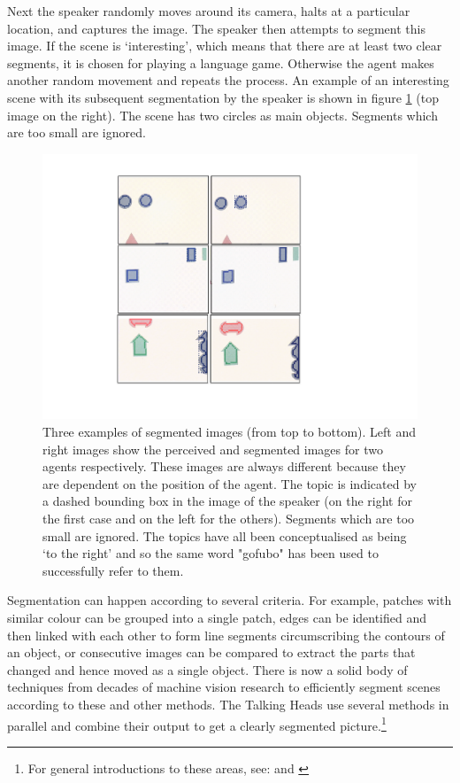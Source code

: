 Next the speaker randomly moves around its camera, halts 
at a particular location, and captures
the image. The speaker then attempts to segment 
this image. If the scene is `interesting', which means that
there are at least two clear segments, it is chosen 
for playing a language game. Otherwise the agent makes another 
random movement and repeats the process. An example of 
an interesting scene with its subsequent segmentation
by the speaker is shown in figure \ref{f:plate10} (top image on the right). The scene
has two circles as main objects. Segments which are too 
small are ignored. 

\begin{figure}[htbp]
  \centerline{\includegraphics[width=.60\textwidth]{chap2/figs/hpos}}
\caption{\small Three examples of segmented images (from top to bottom). Left and right images 
show the perceived and segmented images for two agents respectively. These images are always
different because they are dependent on the position of the agent. 
The topic is indicated by a dashed bounding box in the 
image of the speaker (on the right for the first case and on the left for the others). 
Segments which are too small are ignored. The topics have all been conceptualised
as being `to the right' and so the same word 
"gofubo" has been used to successfully refer to them.}
\label{f:plate10}
\end{figure}

Segmentation can happen according to several criteria. 
For example, patches with similar colour can be grouped 
into a single patch, edges can be identified 
and then linked with each other to form line segments
circumscribing the contours of 
an object, or consecutive images can be compared to extract the parts
that changed and hence moved as a single object. 
There is now a solid body of techniques from decades
of machine vision research to efficiently segment scenes according to 
these and other methods. The Talking Heads use several methods
in parallel and combine their output to get a clearly segmented
picture.\footnote{
For general introductions to these areas, 
see: \cite{Ballard:1982} and \cite{Fischler:1987}}

